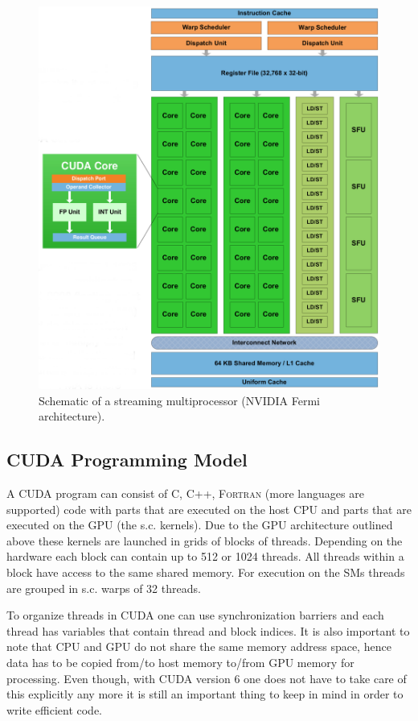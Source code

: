 \documentclass[paper=a4, fontsize=11pt]{scrartcl} %
\numberwithin{equation}{section} %
\numberwithin{figure}{section} %
\numberwithin{table}{section} %
\begin{document}
\begin{figure}
\centering
\includegraphics[width=.8\linewidth]{images/fermi_sm.png}
\caption{Schematic of a streaming multiprocessor (NVIDIA Fermi architecture)\cite{gpu_nvidia_fermi}.}
\label{fig:fermi_sm}
\end{figure}

\subsection{CUDA Programming Model}
A CUDA program can consist of \textsc{C}, \textsc{C++}, \textsc{Fortran} (more languages are supported) code with parts that are executed on the host CPU and parts that are executed on the GPU (the s.c. kernels). Due to the GPU architecture outlined above these kernels are launched in grids of blocks of threads. Depending on the hardware each block can contain up to 512 or 1024 threads. All threads within a block have access to the same shared memory. For execution on the SMs threads are grouped in s.c. warps of 32 threads.

To organize threads in CUDA one can use synchronization barriers and each thread has variables that contain thread and block indices. It is also important to note that CPU and GPU do not share the same memory address space, hence data has to be copied from/to host memory to/from GPU memory for processing. Even though, with CUDA version 6 one does not have to take care of this explicitly any more it is still an important thing to keep in mind in order to write efficient code.
\end{document}
